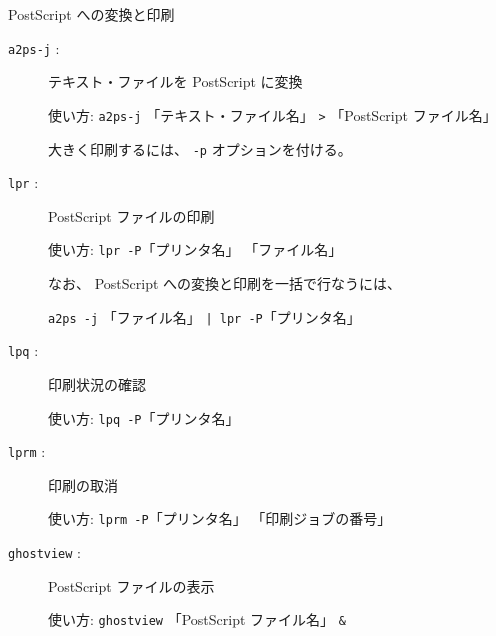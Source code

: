 \begin{center}
\begin{minipage}{13cm}
\begin{itembox}[l]{PostScript への変換と印刷}
\begin{description}
\item[\texttt{a2ps-j} :] テキスト・ファイルを PostScript に変換

使い方: \texttt{a2ps-j} 「テキスト・ファイル名」 \texttt{>} 「PostScript ファイル名」

\hspace*{1cm}大きく印刷するには、 \texttt{-p} オプションを付ける。
\item[\texttt{lpr} :] PostScript ファイルの印刷

使い方: \texttt{lpr -P}「プリンタ名」 「ファイル名」

\hspace*{1cm}なお、 PostScript への変換と印刷を一括で行なうには、

\hspace*{1cm} \texttt{a2ps -j} 「ファイル名」 \texttt{| lpr -P}「プリンタ名」
\item[\texttt{lpq} :] 印刷状況の確認

使い方: \texttt{lpq -P}「プリンタ名」
\item[\texttt{lprm} :] 印刷の取消

使い方: \texttt{lprm -P}「プリンタ名」 「印刷ジョブの番号」
\item[\texttt{ghostview} :] PostScript ファイルの表示

使い方: \texttt{ghostview} 「PostScript ファイル名」 \texttt{\&}
\end{description}
\end{itembox}
\end{minipage}
\end{center}
